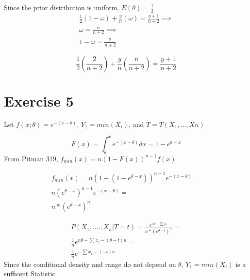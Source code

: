 \documentclass{article}\usepackage[]{graphicx}\usepackage[]{color}
\begin{document}
Since the prior distribution is uniform, $E(\theta) = \frac{1}{2}$
\begin{equation}
\begin{split}
\frac{1}{2}(1-\omega)+\frac{y}{n}(\omega) = \frac{y+1}{n+2} \implies \\
\omega = \frac{n}{n+2} \implies \\
1-\omega =\frac{2}{n+2}
\end{split}
\end{equation}

\begin{equation}
\frac{1}{2}(\frac{2}{n+2})+\frac{y}{n}(\frac{n}{n+2}) = \frac{y+1}{n+2}
\end{equation}


\section*{Exercise 5}
Let $f(x;\theta)=e^{-(x-\theta)}$, $Y_{1}=min(X_{i})$, and $T = T(X_{1},...,X{n})$

\begin{equation}
F(x) = \int_{\theta}^{x} e^{-(x-\theta)}dx = 1-e^{\theta-x}
\end{equation}
From Pitman 319, $f_{min}(x)=n(1-F(x))^{n-1}f(x)$

\begin{equation}
\begin{split}
f_{min}(x) = n(1-(1-e^{\theta-x}))^{n-1}e^{-(x-\theta)} = \\
n(e^{\theta-x})^{n-1}e^{-(x-\theta)} = \\
n*(e^{\theta-x})^{n}
\end{split}
\end{equation}

\begin{equation}
\begin{split}
P(X_{1},....,X_{n}|T=t)= \frac{e^{n\theta-\sum x_{i}}}{n*(e^{\theta-t})^{n}} = \\
\frac{1}{n}e^{n\theta-\sum x_{i}-(\theta-t)n} = \\
\frac{1}{n}e^{-\sum x_{i}-(-t)n}
\end{split}
\end{equation}
Since the conditional density and range do not depend on $\theta$, $Y_{1}=min(X_{i})$ is a sufficent Statistic
\end{document}
